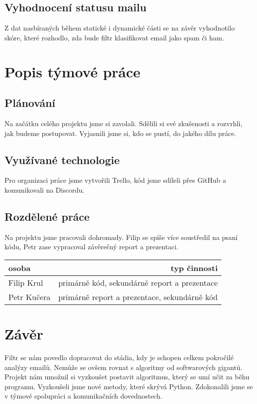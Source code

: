 \documentclass[12pt]{article}
\begin{document}
\subsection{Vyhodnocení statusu mailu}

Z dat nasbíraných během statické i dynamické části se na závěr vyhodnotilo skóre, které rozhodlo, zda bude filtr klasifikovat email jako spam či ham.

\section{Popis týmové práce}

\subsection{Plánování}

Na začátku celého projektu jsme si zavolali. Sdělili si své zkušenosti a rozvrhli, jak budeme postupovat. Vyjasnili jsme si, kdo se pustí, do jakého dílu práce.

\subsection{Využívané technologie}

Pro organizaci práce jsme vytvořili Trello, kód jsme sdíleli přes GitHub a komunikovali na Discordu.

\subsection{Rozdělené práce}

Na projektu jsme pracovali dohromady. Filip se spíše více soustředil na psaní kódu, Petr zase vypracoval závěrečný report a prezentaci.

\begin{center}
\begin{tabular}{l|r}
osoba & typ činnosti\\\hline
Filip Krul & primárně kód, sekundárně report a prezentace \\
Petr Kučera & primárně report a prezentace, sekundárně kód
\end{tabular}
\end{center}

\section{Závěr}

Filtr se nám povedlo dopracovat do stádia, kdy je schopen celkem pokročilé analýzy emailů. Nemůže se ovšem rovnat s algoritmy od softwarových gigantů. Projekt nám umožnil si vyzkoušet postavit algoritmus, který se umí učit za běhu programu. Vyzkoušeli jsme nové metody, které skrývá Python. Zdokonalili jsme se v týmové spolupráci a komunikačních dovednostech.
\end{document}
